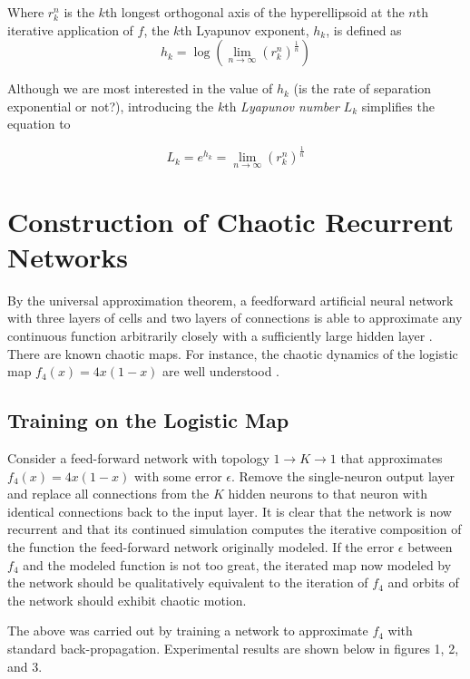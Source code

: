 \documentclass[12pt]{article}
\begin{document}
Where $r_{k}^{n}$ is the $k$th longest orthogonal axis of the
hyperellipsoid at the $n$th iterative application of $f$,
the $k$th Lyapunov exponent, $h_{k}$, is defined as
$$h_{k} = \log \left( \lim \limits_{n \to \infty} (r_{k}^{n})^{\frac{1}{n}}\right)$$

Although we are most interested in the value of $h_{k}$
(is the rate of separation exponential or not?), introducing
the $k$th \textit{Lyapunov number} $L_{k}$ simplifies the equation to

$$L_{k} = e^{h_{k}} = \lim \limits_{n \to \infty} (r_{k}^{n})^{\frac{1}{n}}$$

\section{Construction of Chaotic Recurrent Networks}
By the universal approximation theorem, a feedforward artificial
neural network with three layers of cells and two layers of connections 
is able to approximate any continuous function arbitrarily
closely with a sufficiently large hidden layer \cite{universal}.
There are known chaotic maps.  For instance, the chaotic dynamics of the
logistic map $f_{4}(x) = 4 x (1 - x)$ are well
understood \cite{alligood, hirsch, devaney, sprott}.

\subsection{Training on the Logistic Map}

Consider a feed-forward network with topology $1 \rightarrow K \rightarrow 1$ 
that approximates $f_{4}(x) = 4 x (1 - x)$ with some error $\epsilon$.
Remove the single-neuron
output layer and replace all connections from the $K$ hidden neurons to that
neuron with identical connections back to the input layer.  It is clear that
the network is now recurrent and that its continued simulation computes the
iterative composition of the function the feed-forward network originally
modeled.  If the error $\epsilon$ between $f_{4}$ and the modeled function
is not too great, the iterated map now modeled by the network should be
qualitatively equivalent to the iteration of $f_{4}$ and orbits of the network
should exhibit chaotic motion.

The above was carried out by training a network to approximate $f_{4}$ with
standard back-propagation.  Experimental results are shown below in 
figures 1, 2, and 3.
\end{document}
